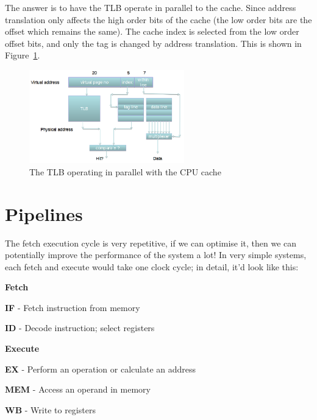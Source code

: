 The answer is to have the TLB operate in parallel to the cache. Since address
translation only affects the high order bits of the cache (the low order bits
are the offset which remains the same). The cache index is selected from the low
order offset bits, and only the tag is changed by address translation. This is 
shown in Figure~\ref{tlb-parallel}.

\begin{figure}[h]
  \centering
  \includegraphics[width=0.6\textwidth]{images/tlb-parallel}
  \caption{The TLB operating in parallel with the CPU cache}
  \label{tlb-parallel}
\end{figure}

\section{Pipelines}
\label{pipelines}

The fetch execution cycle is very repetitive, if we can optimise it, then we can
potentially improve the performance of the system a lot! In very simple systems,
each fetch and execute would take one clock cycle; in detail, it'd look like
this:

\begin{description}
  \item \textbf{Fetch}
    \begin{description}
      \item \textbf{IF} - Fetch instruction from memory
      \item \textbf{ID} - Decode instruction; select registers
    \end{description}
  \item \textbf{Execute}
    \begin{description}
      \item \textbf{EX} - Perform an operation or calculate an address
      \item \textbf{MEM} - Access an operand in memory
      \item \textbf{WB} - Write to registers
    \end{description}
\end{description}

